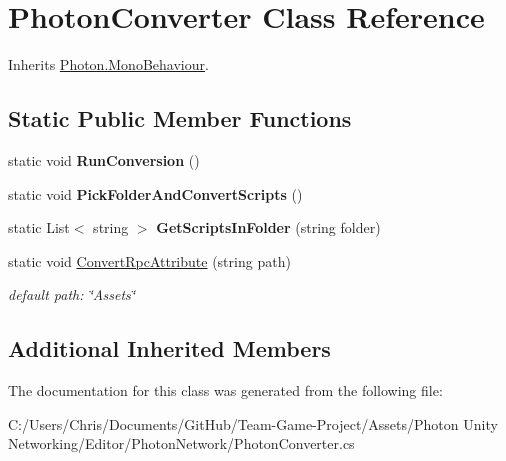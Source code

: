 \hypertarget{class_photon_converter}{}\section{Photon\+Converter Class Reference}
\label{class_photon_converter}


Inherits \hyperlink{class_photon_1_1_mono_behaviour}{Photon.\+Mono\+Behaviour}.

\subsection*{Static Public Member Functions}
\begin{DoxyCompactItemize}
\item 
static void {\bfseries Run\+Conversion} ()\hypertarget{class_photon_converter_a8a0e3279c24dc99ad0a9df0be399435c}{}\label{class_photon_converter_a8a0e3279c24dc99ad0a9df0be399435c}

\item 
static void {\bfseries Pick\+Folder\+And\+Convert\+Scripts} ()\hypertarget{class_photon_converter_a3b9363b3c448859af838fff7beadaf70}{}\label{class_photon_converter_a3b9363b3c448859af838fff7beadaf70}

\item 
static List$<$ string $>$ {\bfseries Get\+Scripts\+In\+Folder} (string folder)\hypertarget{class_photon_converter_a9069c79e964ac9111fe159fb46767b39}{}\label{class_photon_converter_a9069c79e964ac9111fe159fb46767b39}

\item 
static void \hyperlink{class_photon_converter_a5427c432ad183ce9d698a8084e7d8543}{Convert\+Rpc\+Attribute} (string path)\hypertarget{class_photon_converter_a5427c432ad183ce9d698a8084e7d8543}{}\label{class_photon_converter_a5427c432ad183ce9d698a8084e7d8543}

\begin{DoxyCompactList}\small\item\em default path\+: \char`\"{}\+Assets\char`\"{} \end{DoxyCompactList}\end{DoxyCompactItemize}
\subsection*{Additional Inherited Members}


The documentation for this class was generated from the following file\+:\begin{DoxyCompactItemize}
\item 
C\+:/\+Users/\+Chris/\+Documents/\+Git\+Hub/\+Team-\/\+Game-\/\+Project/\+Assets/\+Photon Unity Networking/\+Editor/\+Photon\+Network/Photon\+Converter.\+cs\end{DoxyCompactItemize}
